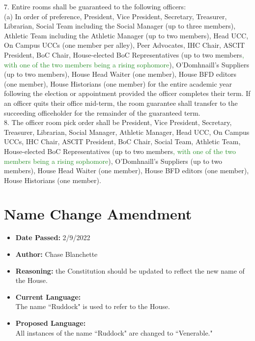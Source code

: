 \documentclass[10pt]{article} %
\begin{document}
\begin{itemize}
	7. Entire rooms shall be guaranteed to the following officers: \\
	(a) In order of preference, President, Vice President, Secretary, Treasurer, Librarian, Social Team including the Social Manager (up to three members), Athletic Team including the Athletic Manager (up to two members), Head UCC, On Campus UCCs (one member per alley), Peer Advocates, IHC Chair, ASCIT President, BoC Chair, House-elected BoC Representatives (up to two members\textcolor{ForestGreen}{, with one of the two members being a rising sophomore}), O’Domhnaill’s Suppliers (up to two members), House Head Waiter (one member), House BFD editors (one member), House Historians (one member) for the entire academic year following the election or appointment provided the officer completes their term. If an officer quits their office mid-term, the room guarantee shall transfer to the succeeding officeholder for the remainder of the guaranteed term. \\
	8. The officer room pick order shall be President, Vice President, Secretary, Treasurer, Librarian, Social Manager, Athletic Manager, Head UCC, On Campus UCCs, IHC Chair, ASCIT President, BoC Chair, Social Team, Athletic Team, House-elected BoC Representatives (up to two members\textcolor{ForestGreen}{, with one of the two members being a rising sophomore}), O’Domhnaill’s Suppliers (up to two members), House Head Waiter (one member), House BFD editors (one member), House Historians (one member).
\end{itemize}

\section{Name Change Amendment}
\begin{itemize}
	\item \textbf{Date Passed:} 2/9/2022
	\item \textbf{Author:} Chase Blanchette
	\item \textbf{Reasoning:} the Constitution should be updated to reflect the new name of the House.
	\item \textbf{Current Language:} \\
	The name ``Ruddock" is used to refer to the House.
	\item \textbf{Proposed Language:} \\
	All instances of the name ``Ruddock" are changed to ``Venerable."
\end{itemize}
\end{document}
